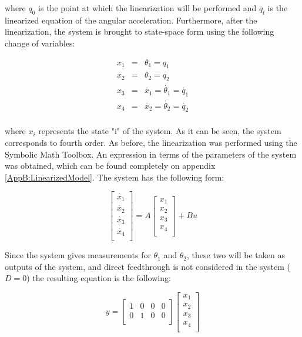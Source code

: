 \documentclass[main.tex]{subfiles}
\begin{document}
where $q_0$  is the point at which the linearization will be performed and $\ddot{q_l}$  is the linearized equation of the angular acceleration. Furthermore, after the linearization, the system is brought to state-space form using the following change of variables:

\begin{eqnarray}
x_1 &=& \theta_1 = q_1 \nonumber \\
x_2 &=& \theta_2 = q_2\nonumber \\
x_3 &=& \dot{x_1} = \dot{\theta_1} = \dot{q_1} \nonumber \\
x_4 &=& \dot{x_2} = \dot{\theta_2} = \dot{q_2} \nonumber \\
\end{eqnarray}

where $x_i$  represents the state "i" of the system. As it can be seen, the system corresponds to fourth order. As before, the linearization was performed using the Symbolic Math Toolbox\textsuperscript{\textregistered}. An expression in terms of the parameters of the system was obtained, which can be found completely on appendix \ref{AppB:LinearizedModel}. The system has the following form:

\begin{equation}
\begin{bmatrix}
\dot{x_1} \\
\dot{x_2} \\
\dot{x_3} \\
\dot{x_4} \\
\end{bmatrix} = 
A 
\begin{bmatrix}
x_1 \\
x_2 \\
x_3 \\
x_4 \\
\end{bmatrix} +
B u
\end{equation} 

Since the system gives measurements for $\theta_1$ and $\theta_2$, these two will be taken as outputs of the system, and direct feedthrough is not considered in the system ($D=0$) the resulting equation is the following:

\begin{equation}
y = 
\begin{bmatrix}
1 & 0 & 0 & 0 \\
0 & 1 & 0 & 0 \\
\end{bmatrix}
\begin{bmatrix}
x_1 \\
x_2 \\
x_3 \\
x_4 \\
\end{bmatrix}
\end{equation} 
\end{document}
